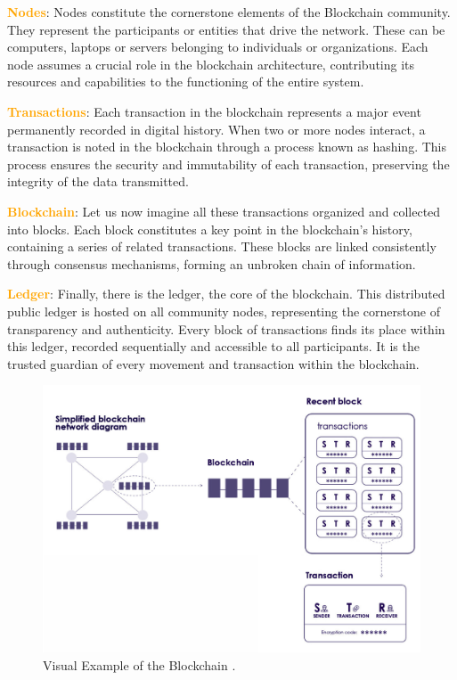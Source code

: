 \textbf{\textcolor{Orange}{Nodes}}: Nodes constitute the cornerstone elements of the Blockchain community. They represent the participants or entities that drive the network. These can be computers, laptops or servers belonging to individuals or organizations. Each node assumes a crucial role in the blockchain architecture, contributing its resources and capabilities to the functioning of the entire system.

\textbf{\textcolor{Orange}{Transactions}}: Each transaction in the blockchain represents a major event permanently recorded in digital history. When two or more nodes interact, a transaction is noted in the blockchain through a process known as hashing. This process ensures the security and immutability of each transaction, preserving the integrity of the data transmitted.

\textbf{\textcolor{Orange}{Blockchain}}: Let us now imagine all these transactions organized and collected into blocks. Each block constitutes a key point in the blockchain's history, containing a series of related transactions. These blocks are linked consistently through consensus mechanisms, forming an unbroken chain of information.

\textbf{\textcolor{Orange}{Ledger}}: Finally, there is the ledger, the core of the blockchain. This distributed public ledger is hosted on all community nodes, representing the cornerstone of transparency and authenticity. Every block of transactions finds its place within this ledger, recorded sequentially and accessible to all participants. It is the trusted guardian of every movement and transaction within the blockchain.

\begin{figure}[hb]
\centering\includegraphics[scale=0.3]{images/chapter2 - Blockchain.png}
\caption{Visual Example of the Blockchain \cite{blockchainFinyear}.}
\end{figure}


